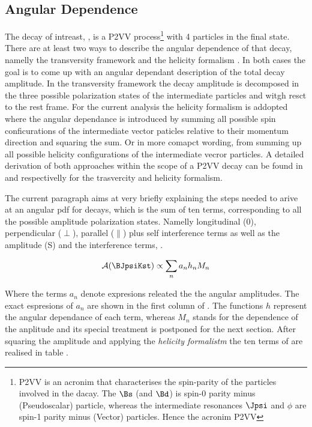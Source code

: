 \subsection{Angular Dependence}
\label{Diferential_Decay_Rate}
The decay of intreast, \BJpsiKst, is a P2VV process\footnote{P2VV is an acronim that characterises the spin-parity of the particles involved in the dacay.
The $\Bs$ (and $\Bd$) is spin-0 parity minus (Pseudoscalar) particle, whereas the intermediate resonances $\Jpsi$ and $\phi$ are spin-1 parity minus (Vector) particles. Hence the
acronim P2VV} with 4 particles in the final state. There are at least two ways to describe the angular dependence of that decay, namelly the transversity framework \cite{transvFrameworkI,transvFrameworkII}
and the helicity formalism \cite{helicityFormI,helicityFormII}. In both cases the goal is to come up with an angular dependant description of the total decay amplitude.
In the transversity framework the decay amplitude is decomposed in the three possible polarization states of the intermediate particles \Jpsi and \Kst witgh resct to the \Bs rest frame. For the current analysis the helicity
formalism is addopted where the angular dependance is introduced by summing all possible spin conficurations of the intermediate vector paticles relative to their 
momentum direction and squaring the sum. Or in more comapct wording, from summing up all possible helicity configurations of the intermediate vecror particles. A detailed derivation of both 
approaches within the scope of a P2VV decay can be found in \cite{daanThesis} and \cite{jeroenThesis} respectivelly for the trasvercity and helicity formalism.
 
The current paragraph aims at very briefly explaining the steps needed to arive at an angular pdf for \BsJpsiKst decays, which is the sum of ten terms, corresponding to
all the possible \pwave amplitude polarization states. Namelly longitudinal ($0$), perpendicular ($\perp$), parallel ($\parallel$) plus \pwave self interference terms as well as 
the \swave amplitude (S) and the \spwave interference terms, .

\begin{equation}
\mathcal{A(\text{\BJpsiKst})} \propto \sum_n a_n h_n M_n
\label{ang_terms}
\end{equation}

\noindent Where the terms $a_n$ denote expresions releated the the angular amplitudes. The exact espresions of $a_n$ are shown in the first column of . The functions $h$ 
represent the angular dependance of each term, whereas $M_n$ stands for the \mkpi dependence of the anplitude and its special treatment is postponed for the next section. 
After squaring the amplitude and applying the \emph{helicity formalistm} the ten terms of  are realised in table .

